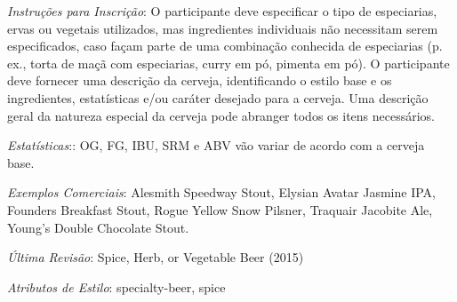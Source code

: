 \textit{Instruções para Inscrição}: O participante deve especificar o tipo de especiarias, ervas ou vegetais utilizados, mas ingredientes individuais não necessitam serem especificados, caso façam parte de uma combinação conhecida de especiarias (p. ex., torta de maçã com especiarias, curry em pó, pimenta em pó). O participante deve fornecer uma descrição da cerveja, identificando o estilo base e os ingredientes, estatísticas e/ou caráter desejado para a cerveja. Uma descrição geral da natureza especial da cerveja pode abranger todos os itens necessários.

\textit{Estatísticas}:: OG, FG, IBU, SRM e ABV vão variar de acordo com a cerveja base.

\textit{Exemplos Comerciais}: Alesmith Speedway Stout, Elysian Avatar Jasmine IPA, Founders Breakfast Stout, Rogue Yellow Snow Pilsner, Traquair Jacobite Ale, Young's Double Chocolate Stout.

\textit{Última Revisão}: Spice, Herb, or Vegetable Beer (2015)

\textit{Atributos de Estilo}: specialty-beer, spice
